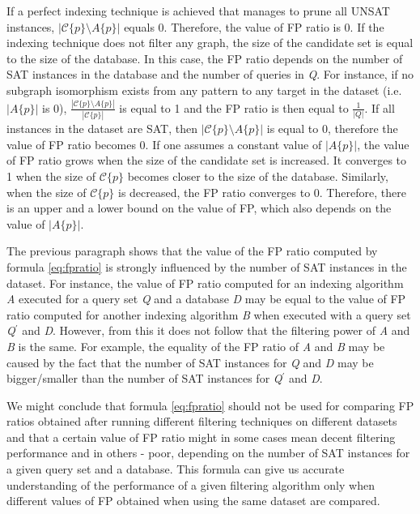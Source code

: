 \documentclass{l4proj}
\newcounter{example}[section]
\newcommand{\fancyC}{\mathcal{C}}
\begin{document}
If a perfect indexing technique is achieved that manages to prune all UNSAT instances, $|\fancyC\{p\} \setminus A\{p\}|$ equals 0. Therefore, the value of FP ratio is 0. If the indexing technique does not filter any graph, the size of the candidate set is equal to the size of the database. In this case, the FP ratio depends on the number of SAT instances in the database and the number of queries in \emph{Q}. For instance, if no subgraph isomorphism exists from any pattern to any target in the dataset (i.e. $|A\{p\}|$ is 0), $\frac{|\fancyC\{p\} \setminus A\{p\}|}{|\fancyC\{p\}|}$ is equal to 1 and the FP ratio is then equal to $\frac{1}{|Q|}$. If all instances in the dataset are SAT, then $|\fancyC\{p\} \setminus A\{p\}|$ is equal to 0, therefore the value of FP ratio becomes 0. If one assumes a constant value of $|A\{p\}|$, the value of FP ratio grows when the size of the candidate set is increased. It converges to 1 when the size of $\fancyC\{p\}$ becomes closer to the size of the database. Similarly, when the size of $\fancyC\{p\}$ is decreased, the FP ratio converges to 0. Therefore, there is an upper and a lower bound on the value of FP, which also depends on the value of $|A\{p\}|$.

The previous paragraph shows that the value of the FP ratio computed by formula \ref{eq:fpratio} is strongly influenced by the number of SAT instances in the dataset. For instance, the value of FP ratio computed for an indexing algorithm \emph{A} executed for a query set \emph{Q} and a database \emph{D} may be equal to the value of FP ratio computed for another indexing algorithm \emph{B} when executed with a query set \emph{Q$^\prime$} and \emph{D}. However, from this it does not follow that the filtering power of \emph{A} and \emph{B} is the same. For example, the equality of the FP ratio of \emph{A} and \emph{B} may be caused by the fact that the number of SAT instances for \emph{Q} and \emph{D} may be bigger/smaller than the number of SAT instances for \emph{Q$^\prime$} and \emph{D}. 

We might conclude that formula \ref{eq:fpratio} should not be used for comparing FP ratios obtained after running different filtering techniques on different datasets and that a certain value of FP ratio might in some cases mean decent filtering performance and in others - poor, depending on the number of SAT instances for a given query set and a database. This formula can give us accurate understanding of the performance of a given filtering algorithm only when different values of FP obtained when using the same dataset are compared.
 
\end{document}
